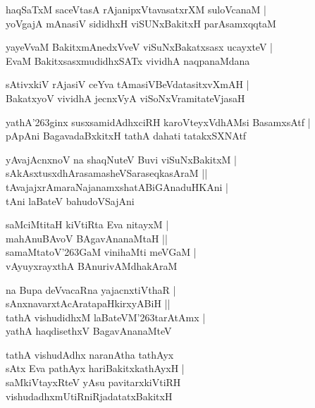 \documentclass[twoside,12pt,openright]{book}
\def\S{\char'263}
\newcounter{shloka}[chapter]
\begin{document}
\begin{shloka}%
haqSaTxM saceVtasA rAjanipxVtavasatxrXM suloVcanaM |\\
yoVgajA mAnasiV sididhxH viSUNxBakitxH parAsamxqqtaM 
\end{shloka}

\begin{shloka}%
yayeVvaM BakitxmAnedxVveV viSuNxBakatxsasx ucayxteV |\\
EvaM BakitxsasxmudidhxSATx vividhA naqpanaMdana
\end{shloka}

\begin{shloka}%
sAtivxkiV rAjasiV ceYva tAmasiVBeVdatasitxvXmAH |\\
BakatxyoV vividhA jecnxVyA viSoNxVramitateVjasaH 
\end{shloka}

\begin{shloka}%
yathA\S ginx susxsamidAdhxciRH karoVteyxVdhAMsi BasamxsAtf |\\
pApAni BagavadaBxkitxH tathA dahati tatakxSXNAtf 
\end{shloka}

\begin{shloka}%
yAvajAcnxnoV na shaqNuteV Buvi viSuNxBakitxM |\\
sAkAsxtusxdhArasamasheVSaraseqkasAraM ||\\
tAvajajxrAmaraNajanamxshatABiGAnaduHKAni |\\
tAni laBateV bahudoVSajAni 
\end{shloka}

\begin{shloka}%
saMciMtitaH kiVtiRta Eva nitayxM |\\
mahAnuBAvoV BAgavAnanaMtaH ||\\
samaMtatoV\S GaM vinihaMti meVGaM |\\
vAyuyxrayxthA BAnurivAMdhakAraM 
\end{shloka}

\begin{shloka}%
na Bupa deVvacaRna yajacnxtiVthaR |\\
sAnxnavarxtAcAratapaHkirxyABiH ||\\
tathA vishudidhxM laBateVM\S tarAtAmx |\\
yathA haqdisethxV BagavAnanaMteV 
\end{shloka}

\begin{shloka}%
tathA vishudAdhx naranAtha tathAyx \\
sAtx Eva pathAyx hariBakitxkathAyxH |\\
saMkiVtayxRteV yAsu pavitarxkiVtiRH \\
vishudadhxmUtiRniRjadatatxBakitxH 
\end{shloka}
\end{document}

